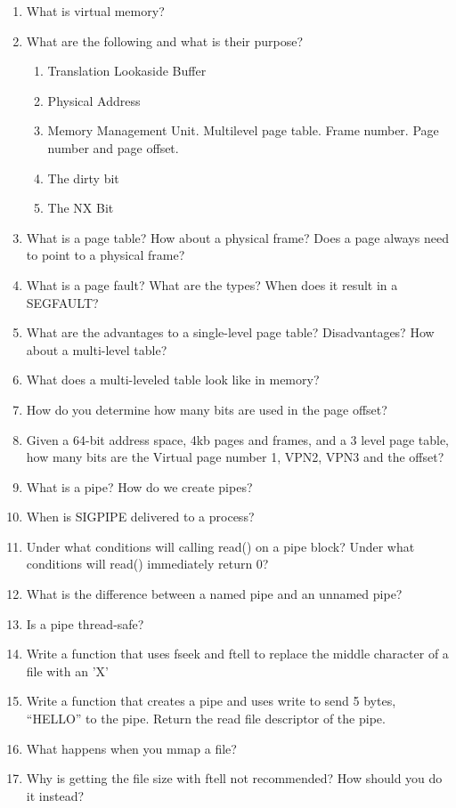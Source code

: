 \begin{enumerate}
	\item What is virtual memory?
	\item What are the following and what is their purpose?
	      \begin{enumerate}
	      	\item Translation Lookaside Buffer
	      	\item Physical Address
	      	\item Memory Management Unit. Multilevel page table. Frame number. Page number and page offset.
	      	\item The dirty bit
	      	\item The NX Bit
	      \end{enumerate}
	\item What is a page table? How about a physical frame? Does a page always need to point to a physical frame?
	\item What is a page fault? What are the types? When does it result in a SEGFAULT?
	\item What are the advantages to a single-level page table? Disadvantages? How about a multi-level table?
	\item What does a multi-leveled table look like in memory?
	\item How do you determine how many bits are used in the page offset?
	\item Given a 64-bit address space, 4kb pages and frames, and a 3 level page table, how many bits are the Virtual page number 1, VPN2, VPN3 and the offset?
	\item What is a pipe? How do we create pipes?
	\item When is SIGPIPE delivered to a process?
	\item Under what conditions will calling read() on a pipe block? Under what conditions will read() immediately return 0?
	\item What is the difference between a named pipe and an unnamed pipe?
	\item Is a pipe thread-safe?
	\item Write a function that uses fseek and ftell to replace the middle character of a file with an 'X'
	\item Write a function that creates a pipe and uses write to send 5 bytes, ``HELLO'' to the pipe. Return the read file descriptor of the pipe.
	\item What happens when you mmap a file?
	\item Why is getting the file size with ftell not recommended? How should you do it instead?
\end{enumerate}
	 



